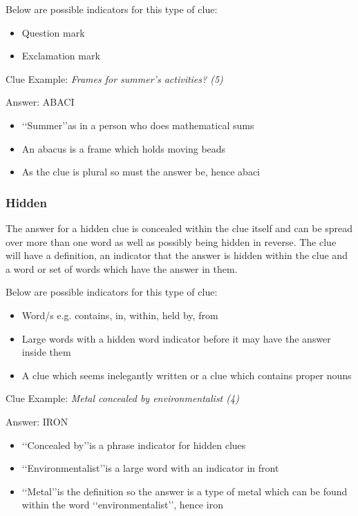 Below are possible indicators for this type of clue:
\begin{itemize} 
	\item Question mark 
	\item Exclamation mark
\\
\end{itemize} 

Clue Example: \emph{Frames for summer's activities? (5)}

Answer: ABACI 

\begin{itemize}
	\item \lq\lq Summer\rq\rq as in a person who does mathematical sums 
	\item An abacus is a frame which holds moving beads 
	\item As the clue is plural so must the answer be, hence abaci
\end{itemize}

\subsubsection{Hidden} 
The answer for a hidden clue is concealed within the clue itself and can be spread over more than one word as well as possibly being hidden in reverse. The clue will have a definition, an indicator that the answer is hidden within the clue and a word or set of words which have the answer in them.  

Below are possible indicators for this type of clue:
\begin{itemize} 
	\item Word/s e.g. contains, in, within, held by, from 
	\item Large words with a hidden word indicator before it may have the answer inside them 
	\item A clue which seems inelegantly written or a clue which contains proper nouns  
\\
\end{itemize}

Clue Example: \emph{Metal concealed by environmentalist (4)} 

Answer: IRON 

\begin{itemize}
	\item \lq\lq Concealed by\rq\rq is a phrase indicator for hidden clues 
	\item \lq\lq Environmentalist\rq\rq is a large word with an indicator in front 
	\item \lq\lq Metal\rq\rq is the definition so the answer is a type of metal which can be found within the word \lq\lq environmentalist\rq\rq, hence iron 
\\
\end{itemize}

